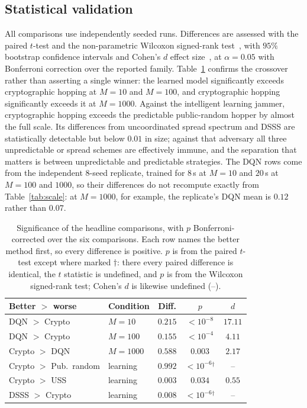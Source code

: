 \documentclass[journal]{IEEEtran}
\begin{document}
\subsection{Statistical validation}
All comparisons use independently seeded runs. Differences are assessed with the
paired $t$-test and the non-parametric Wilcoxon signed-rank test~\cite{ref36},
with $95\%$ bootstrap confidence intervals and Cohen's $d$ effect
size~\cite{ref37}, at $\alpha{=}0.05$ with Bonferroni correction over the
reported family. Table~\ref{tab:stat} confirms the crossover rather than
asserting a single winner: the learned model significantly exceeds
cryptographic hopping at $M{=}10$ and $M{=}100$, and cryptographic hopping
significantly exceeds it at $M{=}1000$. Against the intelligent learning
jammer, cryptographic hopping exceeds the predictable public-random hopper by
almost the full scale. Its differences from uncoordinated spread spectrum and
DSSS are statistically detectable but below $0.01$ in size; against that
adversary all three unpredictable or spread schemes are effectively immune, and
the separation that matters is between unpredictable and predictable strategies.
The DQN rows come from the independent $8$-seed replicate, trained for $8$\,s at
$M{=}10$ and $20$\,s at $M{=}100$ and $1000$, so their differences do not
recompute exactly from Table~\ref{tab:scale}: at $M{=}1000$, for example, the
replicate's DQN mean is $0.12$ rather than $0.07$.

\begin{table}[t]\centering
\caption{Significance of the headline comparisons, with $p$
Bonferroni-corrected over the six comparisons. Each row names the better
method first, so every difference is positive. $p$ is from the paired
$t$-test except where marked $\dagger$: there every paired difference is
identical, the $t$ statistic is undefined, and $p$ is from the Wilcoxon
signed-rank test; Cohen's $d$ is likewise undefined (--).}
\label{tab:stat}\small
\setlength{\tabcolsep}{4pt}
\begin{tabular}{llccc}\toprule
\textbf{Better $>$ worse} & \textbf{Condition} & \textbf{Diff.} & \textbf{$p$} & \textbf{$d$} \\ \midrule
DQN $>$ Crypto & $M{=}10$ & $0.215$ & $<10^{-8}$ & $17.11$ \\
DQN $>$ Crypto & $M{=}100$ & $0.155$ & $<10^{-4}$ & $4.11$ \\
Crypto $>$ DQN & $M{=}1000$ & $0.588$ & $0.003$ & $2.17$ \\
Crypto $>$ Pub.\ random & learning & $0.992$ & $<10^{-6}$$^\dagger$ & -- \\
Crypto $>$ USS & learning & $0.003$ & $0.034$ & $0.55$ \\
DSSS $>$ Crypto & learning & $0.008$ & $<10^{-6}$$^\dagger$ & -- \\
\bottomrule
\end{tabular}
\end{table}
\end{document}
